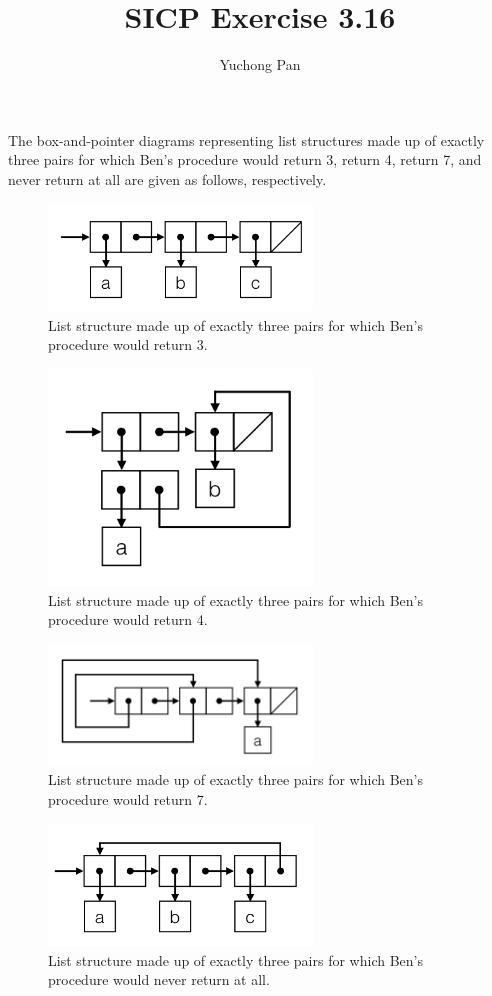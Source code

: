 \documentclass[11pt, oneside]{article}
\title{SICP Exercise 3.16}
\author{Yuchong Pan}
\begin{document}
\maketitle

The box-and-pointer diagrams representing list structures made up of exactly three pairs for which Ben's procedure would return 3, return 4, return 7, and never return at all are given as follows, respectively.

\begin{figure}[h!]
    \centering\includegraphics[width=7cm]{ex-3.16-1.png}
    \caption{List structure made up of exactly three pairs for which Ben's procedure would return 3.}
\end{figure}

\begin{figure}[h!]
    \centering\includegraphics[width=7cm]{ex-3.16-2.png}
    \caption{List structure made up of exactly three pairs for which Ben's procedure would return 4.}
\end{figure}

\begin{figure}[h!]
    \centering\includegraphics[width=7cm]{ex-3.16-3.png}
    \caption{List structure made up of exactly three pairs for which Ben's procedure would return 7.}
\end{figure}

\begin{figure}[h!]
    \centering\includegraphics[width=7cm]{ex-3.16-4.png}
    \caption{List structure made up of exactly three pairs for which Ben's procedure would never return at all.}
\end{figure}
\end{document}
